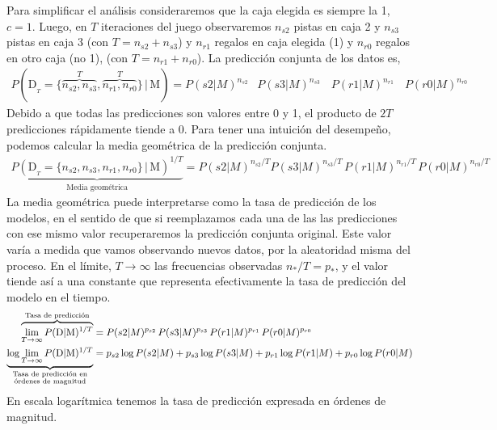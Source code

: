 \documentclass[a4paper,11pt]{book}
\newcommand\hfrac[2]{\genfrac{}{}{0pt}{}{#1}{#2}} %
\theoremstyle{definition}
\begin{document}
Para simplificar el análisis consideraremos que la caja elegida es siempre la 1, $c=1$.
%
Luego, en $T$ iteraciones del juego observaremos $n_{s2}$ pistas en caja 2 y $n_{s3}$ pistas en caja 3 (con $T=n_{s2} + n_{s3}$) y $n_{r1}$ regalos en caja elegida (1) y $n_{r0}$ regalos en otro caja (no 1), (con $T=n_{r1} + n_{r0}$).
%
La predicción conjunta de los datos es,
\begin{align*}
P(\text{D}_{_T} = \{\overbrace{n_{s2}, n_{s3}}^{T}, \overbrace{n_{r1}, n_{r0}}^{T} \} \, | \, \text{M}) = P(s2|M)^{n_{s2}\phantom{/T}}  P(s3|M)^{n_{s3}\phantom{/T}} \, P(r1|M)^{n_{r1}\phantom{/T}} \, P(r0|M)^{n_{r0}\phantom{/T}}
\end{align*}
%
Debido a que todas las predicciones son valores entre 0 y 1, el producto de $2T$ predicciones rápidamente tiende a 0.
%
Para tener una intuición del desempeño, podemos calcular la media geométrica de la predicción conjunta.
%
\begin{align*}
\underbrace{P(\text{D}_{_T} = \{n_{s2}, n_{s3}, n_{r1}, n_{r0}\} \, | \, \text{M})^{1/T}}_{\text{Media geométrica}} = P(s2|M)^{n_{s2}/T}  P(s3|M)^{n_{s3}/T} \, P(r1|M)^{n_{r1}/T} \, P(r0|M)^{n_{r0}/T}
\end{align*}
%
La media geométrica puede interpretarse como la tasa de predicción de los modelos, en el sentido de que si reemplazamos cada una de las las predicciones con ese mismo valor recuperaremos la predicción conjunta original.
%
Este valor varía a medida que vamos observando nuevos datos, por la aleatoridad misma del proceso.
%
En el límite, $T\rightarrow\infty$ las frecuencias observadas $n_{*}/T = p_*$, y el valor tiende así a una constante que representa efectivamente la tasa de predicción del modelo en el tiempo.
%
\begin{align*}
\overbrace{\lim_{T \rightarrow \infty} P(\text{D}|\text{M})^{1/T}}^{\text{Tasa de predicción}} &= P(s2|M)^{p_{s2}} \, P(s3|M)^{p_{s3}} \, P(r1|M)^{p_{r1}} \, P(r0|M)^{p_{r0}} \\
\underbrace{\log \lim_{T \rightarrow \infty} P(\text{D}|\text{M})^{1/T}}_{\hfrac{\text{\scriptsize Tasa de predicción en}}{\text{\scriptsize órdenes de magnitud}}} &= p_{s2} \log P(s2|M) + p_{s3} \log P(s3|M) + p_{r1} \log P(r1|M) + p_{r0} \log P(r0|M)
\end{align*}
%
En escala logarítmica tenemos la tasa de predicción expresada en órdenes de magnitud.

\end{document}
